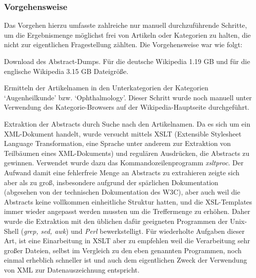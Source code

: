 \documentclass[pagesize,DIV=calc,12pt,draft]{scrreprt}
\begin{document}
\subsubsection{Vorgehensweise}

Das Vorgehen hierzu umfasste zahlreiche nur manuell durchzuführende Schritte, um die Ergebnismenge möglichst frei von Artikeln oder Kategorien zu halten, die nicht zur eigentlichen Fragestellung zählten. 
Die Vorgehensweise war wie folgt: 

\begin{inparaenum}
\item Download des Abstract-Dumps. Für die deutsche Wikipedia 1.19 GB und für die englische Wikipedia 3.15 GB Dateigröße.

\item Ermitteln der Artikelnamen in den Unterkategorien der Kategorien `Augenheilkunde' bzw. `Ophthalmology'. 
Dieser Schritt wurde noch manuell unter Verwendung des Kategorie-Browsers auf der Wikipedia-Hauptseite durchgeführt. 

\item Extraktion der Abstracts durch Suche nach den Artikelnamen. 
Da es sich um ein XML-Dokument handelt, wurde versucht mittels XSLT (Extensible Stylesheet Language Transformation, eine Sprache unter anderem zur Extraktion von Teilbäumen eines XML-Dokuments) und regulären Ausdrücken, die Abstracts zu gewinnen. 
Verwendet wurde dazu das Kommandozeilenprogramm \emph{xsltproc}. 
Der Aufwand damit eine fehlerfreie Menge an Abstracts zu extrahieren zeigte sich aber als zu groß, insbesondere aufgrund der spärlichen Dokumentation (abgesehen von der technischen Dokumentation des W3C), aber auch weil die Abstracts keine vollkommen einheitliche Struktur hatten, und die XSL-Templates immer wieder angepasst werden mussten um die Treffermenge zu erhöhen. 
Daher wurde die Extraktion mit den üblichen dafür geeigneten Programmen der Unix-Shell (\emph{grep, sed, awk}) und \emph{Perl} bewerkstelligt. 
Für wiederholte Aufgaben dieser Art, ist eine Einarbeitung in XSLT aber zu empfehlen weil die Verarbeitung sehr großer Dateien, selbst im Vergleich zu den eben genannten Programmen, noch einmal erheblich schneller ist und auch dem eigentlichen Zweck der Verwendung von XML zur Datenauszeichnung entspricht. 


\end{inparaenum}
\end{document}
